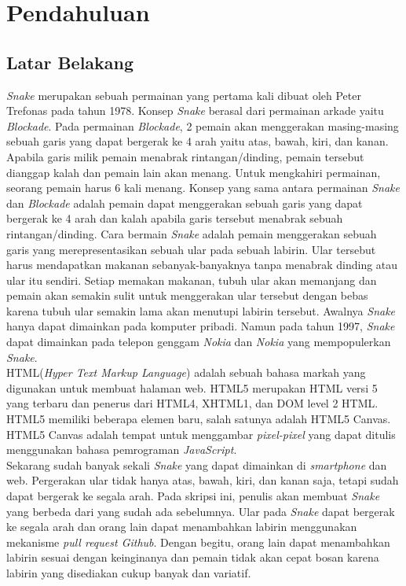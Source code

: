 \chapter{Pendahuluan}
\label{chap:intro}
   
\section{Latar Belakang}
\label{sec:label}

\textit{Snake} merupakan sebuah permainan yang pertama kali dibuat oleh Peter Trefonas pada tahun 1978. Konsep \textit{Snake} berasal dari permainan arkade yaitu \textit{Blockade}. Pada permainan \textit{Blockade}, 2 pemain akan menggerakan masing-masing sebuah garis yang dapat bergerak ke 4 arah yaitu atas, bawah, kiri, dan kanan. Apabila garis milik pemain menabrak rintangan/dinding, pemain tersebut dianggap kalah dan pemain lain akan menang. Untuk mengkahiri permainan, seorang pemain harus 6 kali menang. Konsep yang sama antara permainan \textit{Snake} dan \textit{Blockade} adalah pemain dapat menggerakan sebuah garis yang dapat bergerak ke 4 arah dan kalah apabila garis tersebut menabrak sebuah rintangan/dinding. Cara bermain \textit{Snake} adalah pemain menggerakan sebuah garis yang merepresentasikan sebuah ular pada sebuah labirin. Ular tersebut harus mendapatkan makanan sebanyak-banyaknya tanpa menabrak dinding atau ular itu sendiri. Setiap memakan makanan, tubuh ular akan memanjang dan pemain akan semakin sulit untuk menggerakan ular tersebut dengan bebas karena tubuh ular semakin lama akan menutupi labirin tersebut. Awalnya \textit{Snake} hanya dapat dimainkan pada komputer pribadi. Namun pada tahun 1997, \textit{Snake} dapat dimainkan pada telepon genggam \textit{Nokia} dan \textit{Nokia} yang mempopulerkan \textit{Snake}. \\

HTML(\textit{Hyper Text Markup Language}) adalah sebuah bahasa markah yang digunakan untuk membuat halaman web. HTML5 merupakan HTML versi 5 yang terbaru dan penerus dari HTML4, XHTML1, dan DOM level 2 HTML. HTML5 memiliki beberapa elemen baru, salah satunya adalah HTML5 Canvas. HTML5 Canvas adalah tempat untuk menggambar \textit{pixel-pixel} yang dapat ditulis menggunakan bahasa pemrograman \textit{JavaScript}. \\

Sekarang sudah banyak sekali \textit{Snake} yang dapat dimainkan di \textit{smartphone} dan web. Pergerakan ular tidak hanya atas, bawah, kiri, dan kanan saja, tetapi sudah dapat bergerak ke segala arah. Pada skripsi ini, penulis akan membuat \textit{Snake} yang berbeda dari yang sudah ada sebelumnya. Ular pada \textit{Snake} dapat bergerak ke segala arah dan orang lain dapat menambahkan labirin menggunakan mekanisme \textit{pull request Github}. Dengan begitu, orang lain dapat menambahkan labirin sesuai dengan keinginanya dan pemain tidak akan cepat bosan karena labirin yang disediakan cukup banyak dan variatif.

